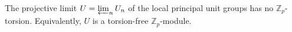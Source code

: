 The projective limit $U = \varprojlim_n U_n$ of the local principal unit groups has no $\mathbb{Z}_p$-torsion. Equivalently, $U$ is a torsion-free $\mathbb{Z}_p$-module.
